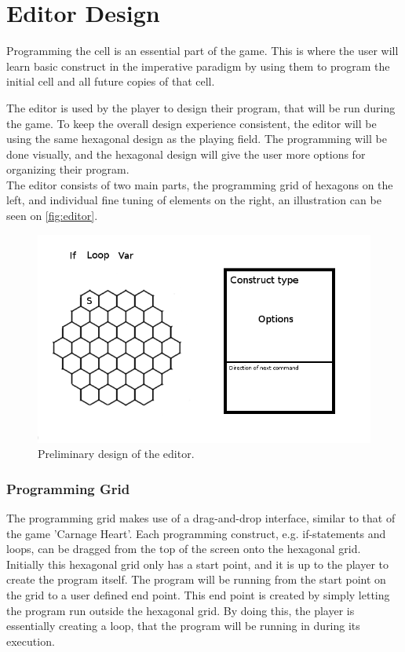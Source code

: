 \section{Editor Design}
Programming the cell is an essential part of the game. This is where the user will learn basic construct in the imperative paradigm by using them to program the initial cell and all future copies of that cell.

The editor is used by the player to design their program, that will be run during the game. To keep the overall design experience consistent, the editor will be using the same hexagonal design as the playing field. The programming will be done visually, and the hexagonal design will give the user more options for organizing their program.\\

The editor consists of two main parts, the programming grid of hexagons on the left, and individual fine tuning of elements on the right, an illustration can be seen on \autoref{fig:editor}.

\begin{figure}[h]
\includegraphics[width=\textwidth]{img/editor.png}
\caption{Preliminary design of the editor.}
\label{fig:editor}
\end{figure}

\subsubsection*{Programming Grid}
The programming grid makes use of a drag-and-drop interface, similar to that of the game 'Carnage Heart'.
Each programming construct, e.g. if-statements and loops, can be dragged from the top of the screen onto the hexagonal grid.
Initially this hexagonal grid only has a start point, and it is up to the player to create the program itself.
The program will be running from the start point on the grid to a user defined end point.
This end point is created by simply letting the program run outside the hexagonal grid.
By doing this, the player is essentially creating a loop, that the program will be running in during its execution.

